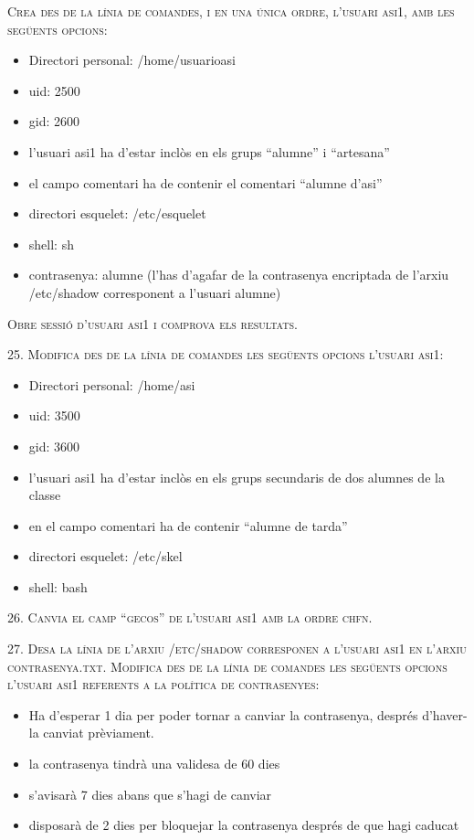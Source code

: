 \documentclass[a4paper,12pt]{article}
\begin{document}
\textsc{Crea des de la línia de comandes, i en una única ordre, l’usuari asi1, amb les següents opcions:}

\begin{itemize}
\item Directori personal: /home/usuarioasi
\item uid: 2500
\item gid: 2600
\item l’usuari asi1 ha d’estar inclòs en els grups “alumne” i “artesana”
\item el campo comentari ha de contenir el comentari “alumne d’asi”
\item directori esquelet: /etc/esquelet
\item shell: sh
\item contrasenya: alumne (l’has d’agafar de la contrasenya encriptada de l’arxiu /etc/shadow corresponent a l’usuari alumne) 
\end{itemize}
\textsc{Obre sessió d’usuari asi1 i comprova els resultats.}

\textsc{25. Modifica des de la línia de comandes les següents opcions l’usuari asi1:}
\begin{itemize}
\item Directori personal: /home/asi
\item uid: 3500
\item gid: 3600
\item l’usuari asi1 ha d’estar inclòs en els grups secundaris de dos alumnes de la classe
\item en el campo comentari ha de contenir “alumne de tarda”
\item directori esquelet: /etc/skel
\item shell: bash
\end{itemize}

\textsc{26. Canvia el camp “gecos” de l’usuari asi1 amb la ordre chfn.}

\textsc{27. Desa la línia de l’arxiu /etc/shadow corresponen a l’usuari asi1 en l’arxiu contrasenya.txt. Modifica des de la línia de comandes les següents opcions l’usuari asi1 referents a la política de contrasenyes:}

\begin{itemize}
\item Ha d’esperar 1 dia per poder tornar a canviar la contrasenya, després d’haver-la canviat prèviament.
\item la contrasenya tindrà una validesa de 60 dies
\item s’avisarà 7 dies abans que s’hagi de canviar
\item disposarà de 2 dies per bloquejar la contrasenya després de que hagi caducat
\end{itemize}
\end{document}
